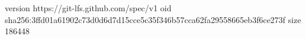 version https://git-lfs.github.com/spec/v1
oid sha256:3ffd01a61902c73d0d6d7d15cce5c35f346b57cca62fa29558665eb3f6ce273f
size 186448
